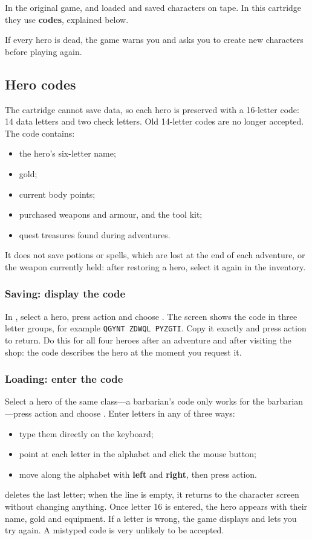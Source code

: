 In the original game,  and  loaded and saved characters on tape. In this cartridge they use \textbf{codes}, explained below.

If every hero is dead, the game warns you and asks you to create new characters before playing again.
\subsection{Hero codes}\label{sec:codigos}
The cartridge cannot save data, so each hero is preserved with a 16-letter code: 14 data letters and two check letters. Old 14-letter codes are no longer accepted. The code contains:
\begin{itemize}
\item the hero's six-letter name;
\item gold;
\item current body points;
\item purchased weapons and armour, and the tool kit;
\item quest treasures found during adventures.
\end{itemize}
It does not save potions or spells, which are lost at the end of each adventure, or the weapon currently held: after restoring a hero, select it again in the inventory.
\subsubsection*{Saving: display the code}
In , select a hero, press action and choose . The screen shows the code in three letter groups, for example \texttt{QGYNT ZDWQL PYZGTI}. Copy it exactly and press action to return. Do this for all four heroes after an adventure and after visiting the shop: the code describes the hero at the moment you request it.
\subsubsection*{Loading: enter the code}
Select a hero of the same class---a barbarian's code only works for the barbarian---press action and choose . Enter letters in any of three ways:
\begin{itemize}
\item type them directly on the keyboard;
\item point at each letter in the alphabet and click the mouse button;
\item move along the alphabet with \textbf{left} and \textbf{right}, then press action.
\end{itemize}
 deletes the last letter; when the line is empty, it returns to the character screen without changing anything. Once letter 16 is entered, the hero appears with their name, gold and equipment. If a letter is wrong, the game displays  and lets you try again. A mistyped code is very unlikely to be accepted.
